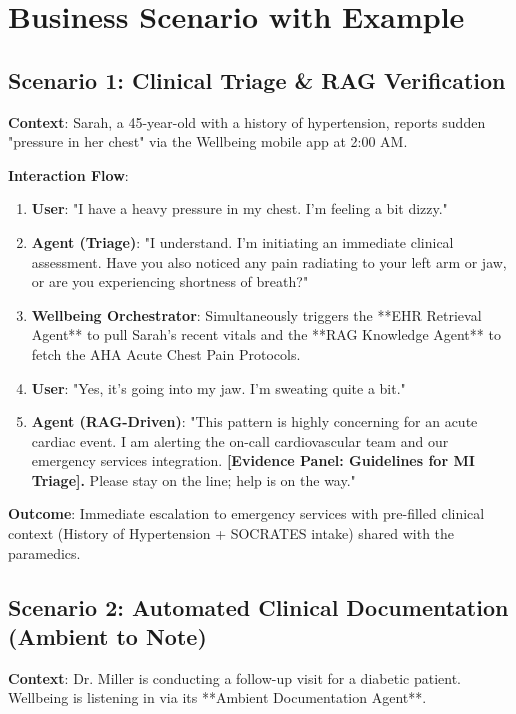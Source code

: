 \documentclass[12pt,a4paper]{article}
\begin{document}
\section{Business Scenario with Example}

\subsection{Scenario 1: Clinical Triage \& RAG Verification}
\textbf{Context}: Sarah, a 45-year-old with a history of hypertension, reports sudden "pressure in her chest" via the Wellbeing mobile app at 2:00 AM.

\textbf{Interaction Flow}:
\begin{enumerate}
    \item \textbf{User}: "I have a heavy pressure in my chest. I'm feeling a bit dizzy."
    \item \textbf{Agent (Triage)}: "I understand. I'm initiating an immediate clinical assessment. Have you also noticed any pain radiating to your left arm or jaw, or are you experiencing shortness of breath?"
    \item \textbf{Wellbeing Orchestrator}: Simultaneously triggers the **EHR Retrieval Agent** to pull Sarah's recent vitals and the **RAG Knowledge Agent** to fetch the AHA Acute Chest Pain Protocols.
    \item \textbf{User}: "Yes, it’s going into my jaw. I'm sweating quite a bit."
    \item \textbf{Agent (RAG-Driven)}: "This pattern is highly concerning for an acute cardiac event. I am alerting the on-call cardiovascular team and our emergency services integration. \textbf{[Evidence Panel: Guidelines for MI Triage].} Please stay on the line; help is on the way."
\end{enumerate}
\textbf{Outcome}: Immediate escalation to emergency services with pre-filled clinical context (History of Hypertension + SOCRATES intake) shared with the paramedics.

\subsection{Scenario 2: Automated Clinical Documentation (Ambient to Note)}
\textbf{Context}: Dr. Miller is conducting a follow-up visit for a diabetic patient. Wellbeing is listening in via its **Ambient Documentation Agent**.
\end{document}
